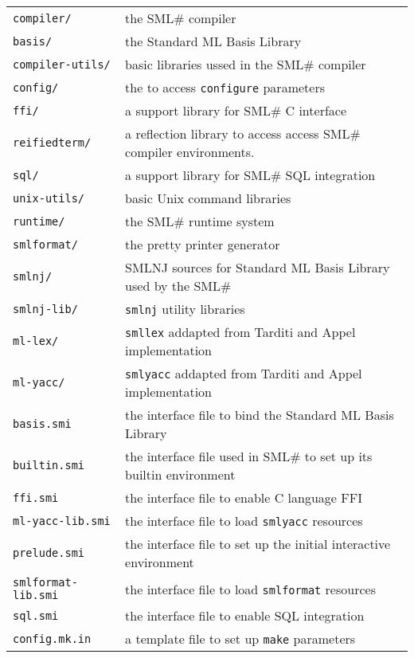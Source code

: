 \documentclass{jbook}
\newcommand{\smlsharp}{SML\#}
\newcommand{\code}[1]{\mbox{\large\tt #1}}
\begin{document}
\begin{tabular}{ll}
\code{compiler/}& the \smlsharp{} compiler
\\
\code{basis/}&  the Standard ML Basis Library
\\
\code{compiler-utils/}&  basic libraries ussed in the \smlsharp{} compiler
\\
\code{config/}& the to access \code{configure} parameters
\\
\code{ffi/}&  a support library for \smlsharp{} C interface
\\
\code{reifiedterm/}& a reflection library to access access \smlsharp{}
    compiler environments.
\\
\code{sql/}& a support library for \smlsharp{} SQL integration
\\
\code{unix-utils/}& basic Unix command libraries
\\
\code{runtime/}&  the \smlsharp{} runtime system
\\
\code{smlformat/}&  the pretty printer generator
\\
\code{smlnj/}&  SMLNJ sources for Standard ML Basis Library used by the \smlsharp{}
\\
\code{smlnj-lib/}&  \code{smlnj} utility libraries
\\
\code{ml-lex/}& \code{smllex} addapted from Tarditi and Appel implementation
\\
\code{ml-yacc/}& \code{smlyacc} addapted from Tarditi and Appel implementation
\\
\code{basis.smi}&  the interface file to bind the Standard ML Basis Library
\\
\code{builtin.smi}& the interface file used in \smlsharp{} to set up its
    builtin environment
\\
\code{ffi.smi}&  the interface file to enable C language FFI
\\
\code{ml-yacc-lib.smi}&  the interface file to load \code{smlyacc} resources
\\
\code{prelude.smi}&  the interface file to set up the initial interactive environment
\\
\code{smlformat-lib.smi}& the interface file to load \code{smlformat} resources
\\
\code{sql.smi}& the interface file to enable SQL integration
\\
\code{config.mk.in}&  a template file to set up \code{make} parameters
\\
\end{tabular}
\fi%
\end{document}
